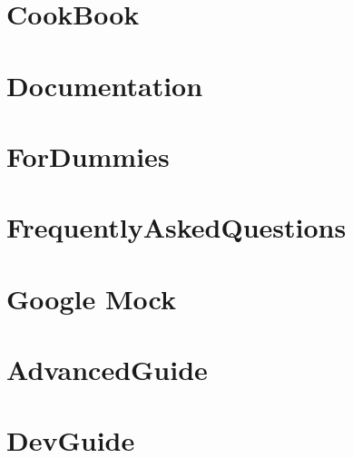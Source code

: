 \documentclass[twoside]{book}
\newcommand{\+}{\discretionary{\mbox{\scriptsize$\hookleftarrow$}}{}{}}
\begin{document}
\chapter{Cook\+Book}
\label{md_vendor_googletest_googlemock_docs_v1_7__cook_book}

\chapter{Documentation}
\label{md_vendor_googletest_googlemock_docs_v1_7__documentation}

\chapter{For\+Dummies}
\label{md_vendor_googletest_googlemock_docs_v1_7__for_dummies}

\chapter{Frequently\+Asked\+Questions}
\label{md_vendor_googletest_googlemock_docs_v1_7__frequently_asked_questions}

\chapter{Google Mock}
\label{md_vendor_googletest_googlemock__r_e_a_d_m_e}

\chapter{Advanced\+Guide}
\label{md_vendor_googletest_googletest_docs__advanced_guide}

\chapter{Dev\+Guide}
\label{md_vendor_googletest_googletest_docs__dev_guide}

\end{document}
